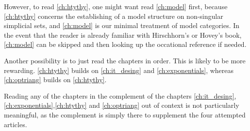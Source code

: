 However, to read \cref{ch:htythy}, one might want read \cref{ch:model} first, because \cref{ch:htythy} concerns the establishing of a model structure on non-singular simplicial sets, and \cref{ch:model} is our minimal treatment of model categories. In the event that the reader is already familiar with Hirschhorn's or Hovey's book, \cref{ch:model} can be skipped and then looking up the occational reference if needed.

Another possibility is to just read the chapters in order. This is likely to be more rewarding. \cref{ch:htythy} builds on \cref{ch:it_desing} and \cref{ch:exponentials}, whereas \cref{ch:optriang} builds on \cref{ch:htythy}.

Reading any of the chapters in the complement of the chapters \ref{ch:it_desing},\ref{ch:exponentials},\ref{ch:htythy} and \ref{ch:optriang} out of context is not particularly meaningful, as the complement is simply there to supplement the four attempted articles.

